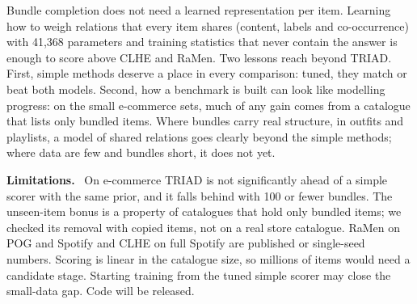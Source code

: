 \documentclass[runningheads]{llncs}
\renewcommand{\paragraph}[1]{\smallskip\noindent\textbf{#1}\ }
\begin{document}
Bundle completion does not need a learned representation per item. Learning how to weigh relations that every item
shares (content, labels and co-occurrence) with 41,368 parameters and training statistics that never contain the
answer is enough to score above CLHE and RaMen. Two lessons reach beyond TRIAD. First, simple methods deserve a place
in every comparison: tuned, they match or beat both models. Second, how a benchmark
is built can look like modelling progress: on the small e-commerce sets, much of any gain comes from a
catalogue that lists only bundled items. Where bundles carry real structure, in outfits and playlists, a model of shared
relations goes clearly beyond the simple methods; where data are few and bundles short, it does not yet.

\paragraph{Limitations.} On e-commerce TRIAD is not significantly ahead of a simple scorer with the same prior, and it
falls behind with 100 or fewer bundles. The unseen-item bonus is a property of catalogues that hold only bundled
items; we checked its removal with copied items, not on a real store catalogue. RaMen on POG and Spotify and CLHE on
full Spotify are published or single-seed numbers. Scoring is linear in the
catalogue size, so millions of items would need a candidate stage. Starting training from the tuned simple scorer may
close the small-data gap. Code will be released.
\end{document}
